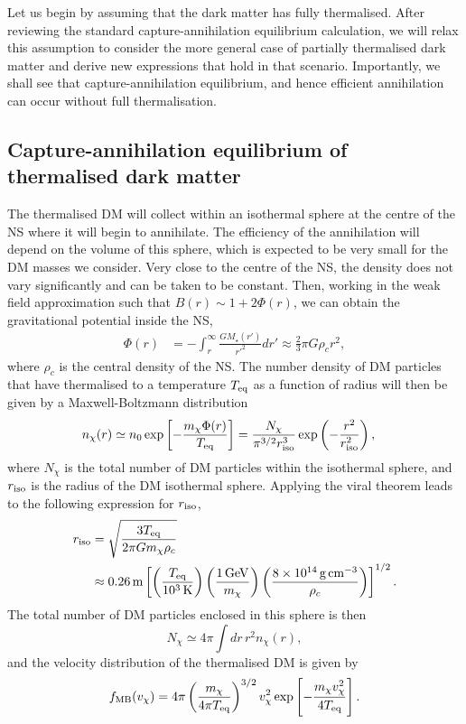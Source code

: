 Let us begin by assuming that the dark matter has fully thermalised. After reviewing the standard capture-annihilation equilibrium calculation, we will relax this assumption to consider the more general case of partially thermalised dark matter and derive new expressions that hold in that scenario. Importantly, we shall see that capture-annihilation equilibrium, and hence efficient annihilation can occur without full thermalisation.

\subsection{Capture-annihilation equilibrium of thermalised dark matter}


The thermalised DM will collect within an isothermal sphere at the centre of the NS where it will begin to annihilate. The efficiency of the annihilation will depend on the volume of this sphere, which is expected to be very small for the DM masses we consider. 
Very close to the centre of the NS, the density does not vary significantly and can be taken to be constant. Then, working in the weak field approximation such that $B(r) \sim  1+2\Phi(r)$, 
we can obtain the gravitational potential inside the NS,
\begin{align}
\Phi(r) & = -\int_r^\infty \frac{G M_\star(r')}{r'^2}dr' 
\approx \frac{2}{3}\pi G \rho_c r^2, 
\end{align}
where $\rho_c$ is the central density of the NS. 
The  number density of DM particles that have thermalised to a temperature $T_{\rm eq}$ as a function of radius will then be given by a Maxwell-Boltzmann distribution
\begin{align}
n_{\chi}(r) & \simeq n_0 \exp\left[ -\frac{m_\chi\Phi(r)}{T_{\rm eq}}\right] 
= \frac{N_\chi}{\pi^{3/2}  r_{\rm iso}^3}\exp\left( -\frac{r^2}{ r_{\rm iso}^2}\right), 
\end{align}
where $N_\chi$ is the total number of DM particles within the isothermal sphere, and $r_{\rm iso}$ is the radius of the DM isothermal sphere. 
Applying the viral theorem leads to the following expression for $r_{\rm iso}$, 
\begin{align}
r_{\rm iso} & = \sqrt{\frac{3 T_{\rm eq}}{2\pi G m_\chi \rho_c}} \nonumber\\
& \approx  0.26\,\text{m}\left[\left(\frac{T_{\rm eq}}{10^3\,\text{K}}\right)\left(\frac{1{\rm \,GeV}}{m_\chi}\right)\left(\frac{8\times10^{14}\,\textrm{g}\,\text{cm}^{-3}}{\rho_c}\right)\right]^{1/2}.
\end{align}
The total number of DM particles enclosed in this sphere is then
\begin{equation}
    N_\chi    \simeq  4\pi\int dr \, r^2n_{\chi}(r),
\end{equation} 
and the velocity distribution of the thermalised DM is  given by
\begin{equation}
f_{\rm MB}(v_\chi)  = 4\pi \left(\frac{m_\chi}{4 \pi T_{\rm eq}}\right)^{3/2} v_\chi^2 \exp\left[ -\frac{m_\chi v_\chi^2}{4 T_{\rm eq}} \right].
\end{equation}




